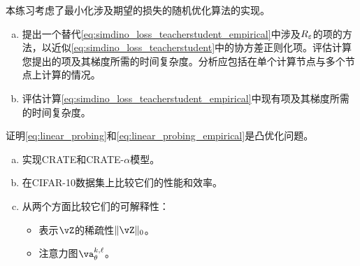 \documentclass[../../book-main_zh.tex]{subfiles}
\begin{document}
\begin{exercise}
    本练习考虑了最小化涉及期望的损失的随机优化算法的实现。
    \begin{enumerate}[(a)]
        \item 提出一个替代\eqref{eq:simdino_loss_teacherstudent_empirical}中涉及\(R_{\varepsilon}\)的项的方法，以近似\eqref{eq:simdino_loss_teacherstudent}中的协方差正则化项。评估计算您提出的项及其梯度所需的时间复杂度。分析应包括在单个计算节点与多个节点上计算的情况。
        \item  评估计算\eqref{eq:simdino_loss_teacherstudent_empirical}中现有项及其梯度所需的时间复杂度。
    \end{enumerate}
\end{exercise}

\begin{exercise}
    证明\eqref{eq:linear_probing}和\eqref{eq:linear_probing_empirical}是凸优化问题。
\end{exercise}

\begin{exercise}
    \phantom{}
    \begin{enumerate}[(a)]
        \item 实现CRATE和CRATE-\(\alpha\)模型。
        \item 在CIFAR-10数据集上比较它们的性能和效率。
        \item 从两个方面比较它们的可解释性：
        \begin{itemize}
            \item 表示\(\vZ\)的稀疏性\(\norm{\vZ}_{0}\)。
            \item 注意力图\(\va_{\theta}^{k, \ell}\)。
        \end{itemize}
    \end{enumerate}
\end{exercise}
\end{document}
